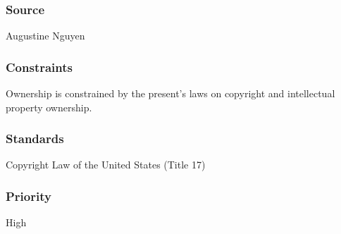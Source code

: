\subsubsection{Source}
Augustine Nguyen
\subsubsection{Constraints}
Ownership is constrained by the present's laws on copyright and intellectual property ownership.
\subsubsection{Standards}
Copyright Law of the United States (Title 17)
\subsubsection{Priority}
High